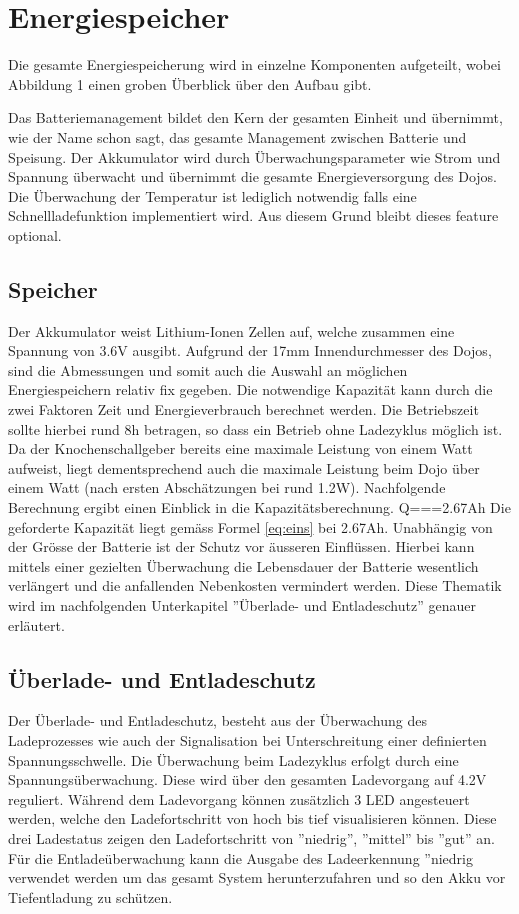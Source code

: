 \section{Energiespeicher}
Die gesamte Energiespeicherung wird in einzelne Komponenten aufgeteilt, wobei Abbildung 1 einen groben Überblick über den Aufbau gibt.
\linebreak

Das Batteriemanagement bildet den Kern der gesamten Einheit und übernimmt, wie der Name schon sagt, das gesamte Management zwischen Batterie und Speisung. Der Akkumulator wird durch Überwachungsparameter wie Strom und Spannung überwacht und übernimmt die gesamte Energieversorgung des Dojos. Die Überwachung der Temperatur ist lediglich notwendig falls eine Schnellladefunktion implementiert wird. Aus diesem Grund bleibt dieses feature optional.
\linebreak
\subsection{Speicher}
Der Akkumulator weist Lithium-Ionen Zellen auf, welche zusammen eine Spannung von 3.6V ausgibt. Aufgrund der 17mm Innendurchmesser des Dojos, sind die Abmessungen und somit auch die Auswahl an möglichen Energiespeichern relativ fix gegeben. Die notwendige Kapazität kann durch die zwei Faktoren Zeit und Energieverbrauch berechnet werden. Die Betriebszeit sollte hierbei rund 8h betragen, so dass ein Betrieb ohne Ladezyklus möglich ist. Da der Knochenschallgeber bereits eine maximale Leistung von einem Watt aufweist, liegt dementsprechend auch die maximale Leistung beim Dojo über einem Watt (nach ersten Abschätzungen bei rund 1.2W). Nachfolgende Berechnung ergibt einen Einblick in die Kapazitätsberechnung.
Q===2.67Ah \label{eq:eins}
Die geforderte Kapazität liegt gemäss Formel \ref{eq:eins} bei 2.67Ah. Unabhängig von der Grösse der Batterie ist der Schutz vor äusseren Einflüssen. Hierbei kann mittels einer gezielten Überwachung die Lebensdauer der Batterie wesentlich verlängert und die anfallenden Nebenkosten vermindert werden. Diese Thematik wird im nachfolgenden Unterkapitel ”Überlade- und Entladeschutz” genauer erläutert.
\linebreak
\subsection{Überlade- und Entladeschutz}
Der Überlade- und Entladeschutz, besteht aus der Überwachung des Ladeprozesses wie auch der Signalisation bei Unterschreitung einer definierten Spannungsschwelle. Die Überwachung beim Ladezyklus erfolgt durch eine Spannungsüberwachung. Diese wird über den gesamten Ladevorgang auf 4.2V reguliert. Während dem Ladevorgang können zusätzlich 3 LED angesteuert werden, welche den Ladefortschritt von hoch bis tief visualisieren können. Diese drei Ladestatus zeigen den Ladefortschritt von ”niedrig”, ”mittel” bis ”gut” an. Für die Entladeüberwachung kann die Ausgabe des Ladeerkennung ”niedrig verwendet werden um das gesamt System herunterzufahren und so den Akku vor Tiefentladung zu schützen.